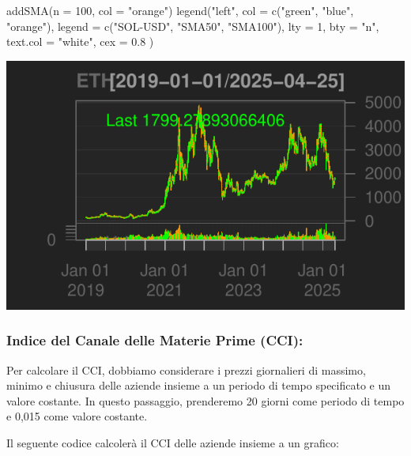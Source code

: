 \documentclass[]{tufte-handout}
\newenvironment{Shaded}{}{}
\newcommand{\AttributeTok}[1]{\textcolor[rgb]{0.49,0.56,0.16}{#1}}
\newcommand{\DecValTok}[1]{\textcolor[rgb]{0.25,0.63,0.44}{#1}}
\newcommand{\FloatTok}[1]{\textcolor[rgb]{0.25,0.63,0.44}{#1}}
\newcommand{\FunctionTok}[1]{\textcolor[rgb]{0.02,0.16,0.49}{#1}}
\newcommand{\NormalTok}[1]{#1}
\newcommand{\StringTok}[1]{\textcolor[rgb]{0.25,0.44,0.63}{#1}}
\begin{document}
\begin{Shaded}
\begin{Highlighting}[]
\FunctionTok{addSMA}\NormalTok{(}\AttributeTok{n =} \DecValTok{100}\NormalTok{, }\AttributeTok{col =} \StringTok{"orange"}\NormalTok{)}
\FunctionTok{legend}\NormalTok{(}\StringTok{"left"}\NormalTok{,}
  \AttributeTok{col =} \FunctionTok{c}\NormalTok{(}\StringTok{"green"}\NormalTok{, }\StringTok{"blue"}\NormalTok{, }\StringTok{"orange"}\NormalTok{),}
  \AttributeTok{legend =} \FunctionTok{c}\NormalTok{(}\StringTok{"SOL{-}USD"}\NormalTok{, }\StringTok{"SMA50"}\NormalTok{, }\StringTok{"SMA100"}\NormalTok{), }\AttributeTok{lty =} \DecValTok{1}\NormalTok{, }\AttributeTok{bty =} \StringTok{"n"}\NormalTok{,}
  \AttributeTok{text.col =} \StringTok{"white"}\NormalTok{, }\AttributeTok{cex =} \FloatTok{0.8}
\NormalTok{)}
\end{Highlighting}
\end{Shaded}

\includegraphics{cripto_update_files/figure-latex/unnamed-chunk-11-3}

\hypertarget{indice-del-canale-delle-materie-prime-cci}{%
\subsubsection{Indice del Canale delle Materie Prime
(CCI):}\label{indice-del-canale-delle-materie-prime-cci}}

Per calcolare il CCI, dobbiamo considerare i prezzi giornalieri di
massimo, minimo e chiusura delle aziende insieme a un periodo di tempo
specificato e un valore costante. In questo passaggio, prenderemo 20
giorni come periodo di tempo e 0,015 come valore costante.

Il seguente codice calcolerà il CCI delle aziende insieme a un grafico:
\end{document}
